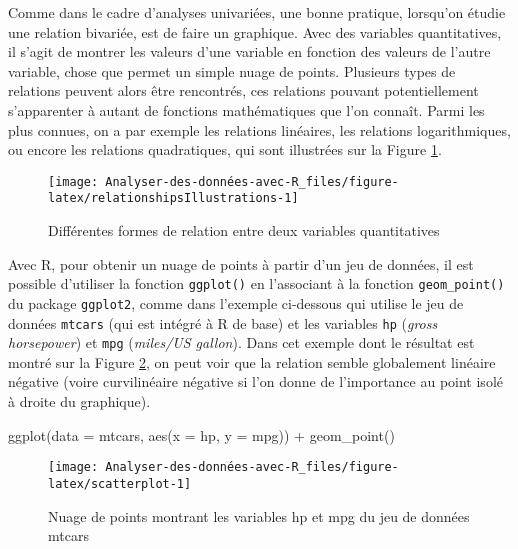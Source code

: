 \documentclass[
]{book}
\newenvironment{Shaded}{\begin{snugshade}}{\end{snugshade}}
\newcommand{\AttributeTok}[1]{\textcolor[rgb]{0.77,0.63,0.00}{#1}}
\newcommand{\FunctionTok}[1]{\textcolor[rgb]{0.00,0.00,0.00}{#1}}
\newcommand{\NormalTok}[1]{#1}
\newcommand{\SpecialCharTok}[1]{\textcolor[rgb]{0.00,0.00,0.00}{#1}}
\begin{document}
Comme dans le cadre d'analyses univariées, une bonne pratique, lorsqu'on étudie une relation bivariée, est de faire un graphique. Avec des variables quantitatives, il s'agit de montrer les valeurs d'une variable en fonction des valeurs de l'autre variable, chose que permet un simple nuage de points. Plusieurs types de relations peuvent alors être rencontrés, ces relations pouvant potentiellement s'apparenter à autant de fonctions mathématiques que l'on connaît. Parmi les plus connues, on a par exemple les relations linéaires, les relations logarithmiques, ou encore les relations quadratiques, qui sont illustrées sur la Figure \ref{fig:relationshipsIllustrations}.

\begin{figure}

{\centering \texttt{[image: Analyser-des-données-avec-R\_files/figure-latex/relationshipsIllustrations-1]} 

}

\caption{Différentes formes de relation entre deux variables quantitatives}\label{fig:relationshipsIllustrations}
\end{figure}

Avec R, pour obtenir un nuage de points à partir d'un jeu de données, il est possible d'utiliser la fonction \texttt{ggplot()} en l'associant à la fonction \texttt{geom\_point()} du package \texttt{ggplot2}, comme dans l'exemple ci-dessous qui utilise le jeu de données \texttt{mtcars} (qui est intégré à R de base) et les variables \texttt{hp} (\emph{gross horsepower}) et \texttt{mpg} (\emph{miles/US gallon}). Dans cet exemple dont le résultat est montré sur la Figure \ref{fig:scatterplot}, on peut voir que la relation semble globalement linéaire négative (voire curvilinéaire négative si l'on donne de l'importance au point isolé à droite du graphique).

\begin{Shaded}
\begin{Highlighting}[]
\FunctionTok{ggplot}\NormalTok{(}\AttributeTok{data =}\NormalTok{ mtcars, }\FunctionTok{aes}\NormalTok{(}\AttributeTok{x =}\NormalTok{ hp, }\AttributeTok{y =}\NormalTok{ mpg)) }\SpecialCharTok{+} 
  \FunctionTok{geom\_point}\NormalTok{()}
\end{Highlighting}
\end{Shaded}

\begin{figure}

{\centering \texttt{[image: Analyser-des-données-avec-R\_files/figure-latex/scatterplot-1]} 

}

\caption{Nuage de points montrant les variables hp et mpg du jeu de données mtcars}\label{fig:scatterplot}
\end{figure}
\end{document}
